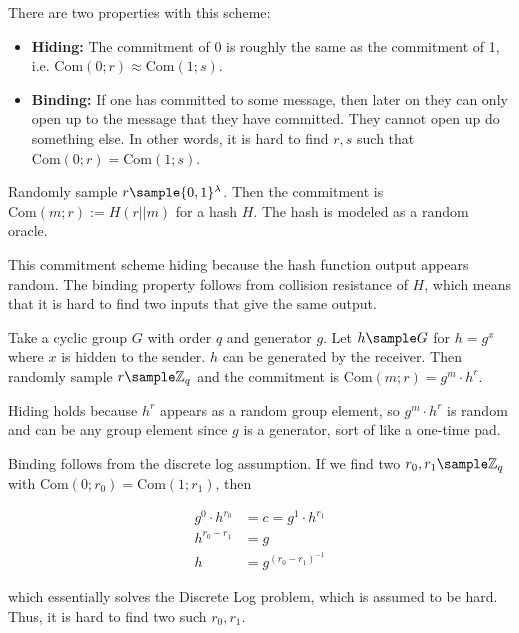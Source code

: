 There are two properties with this scheme:
\begin{itemize}
    \item \textbf{Hiding:} The commitment of 0 is roughly the same as the commitment of 1, i.e. $\text{Com}(0; r) \approx \text{Com}(1; s)$.
    \item \textbf{Binding:} If one has committed to some message, then later on they can only open up to the message that they have committed. They cannot open up do something else. In other words, it is hard to find $r, s$ such that $\text{Com}(0;r) = \text{Com}(1;s)$.
\end{itemize}

\begin{example}
Randomly sample $r \sample \{0, 1\}^\lambda$. Then the commitment is $\text{Com}(m;r) := H(r || m)$ for a hash $H$. The hash is modeled as a random oracle.

This commitment scheme hiding because the hash function output appears random. The binding property follows from collision resistance of $H$, which means that it is hard to find two inputs that give the same output.

\end{example}

\begin{example}
Take a cyclic group $G$ with order $q$ and generator $g$. Let $h \sample G$ for $h = g^x$ where $x$ is hidden to the sender. $h$ can be generated by the receiver. Then randomly sample $r \sample \ZZ_q$ and the commitment is $\text{Com}(m;r) = g^m \cdot h^r.$

Hiding holds because $h^r$ appears as a random group element, so $g^m \cdot h^r$ is random and can be any group element since $g$ is a generator, sort of like a one-time pad.

Binding follows from the discrete log assumption. If we find two $r_0, r_1 \sample \ZZ_q$ with $\text{Com}(0;r_0) = \text{Com}(1;r_1)$, then

\begin{align*}
    g^0 \cdot h^{r_0} &= c = g^1 \cdot h^{r_1}\\
    h ^{r_0 - r_1} &= g\\
    h &= g^{(r_0 - r_1)^{-1}}
\end{align*}

which essentially solves the Discrete Log problem, which is assumed to be hard. Thus, it is hard to find two such $r_0, r_1$.

\end{example}

